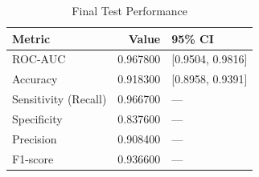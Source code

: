 \begin{table}
\caption{Final Test Performance}
\label{tab:final}
\begin{tabular}{lrl}
\toprule
Metric & Value & 95\% CI \\
\midrule
ROC-AUC & 0.967800 & [0.9504, 0.9816] \\
Accuracy & 0.918300 & [0.8958, 0.9391] \\
Sensitivity (Recall) & 0.966700 & — \\
Specificity & 0.837600 & — \\
Precision & 0.908400 & — \\
F1-score & 0.936600 & — \\
\bottomrule
\end{tabular}
\end{table}
